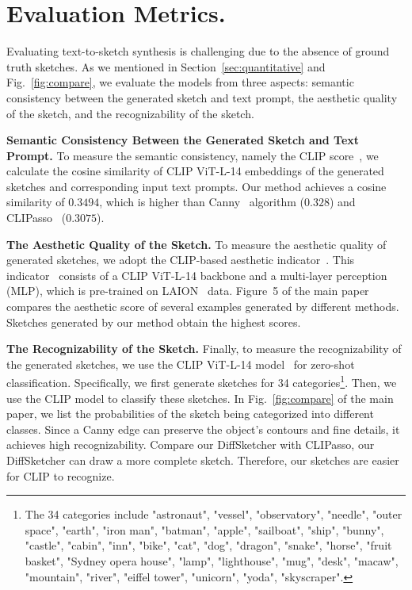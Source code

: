 \documentclass{article}
\begin{document}
\section{Evaluation Metrics.}
\label{supp:metric}
Evaluating text-to-sketch synthesis is challenging due to the absence of ground truth sketches. As we mentioned in Section~\ref{sec:quantitative} and Fig.~\ref{fig:compare}, we evaluate the models from three aspects: semantic consistency between the generated sketch and text prompt, the aesthetic quality of the sketch, and the recognizability of the sketch.

\textbf{Semantic Consistency Between the Generated Sketch and Text Prompt. } To measure the semantic consistency, namely the CLIP score~\cite{ldm_2022_Rombach,clipdraw_frans_2022}, we calculate the cosine similarity of CLIP ViT-L-14 embeddings of the generated sketches and corresponding input text prompts. 
Our method achieves a cosine similarity of $0.3494$, which is higher than  Canny~\cite{canny_1986} algorithm ($0.328$) and CLIPasso~\cite{vinker_2022_clipasso} ($0.3075$).

\textbf{The Aesthetic Quality of the Sketch. } To measure the aesthetic quality of generated sketches, we adopt the CLIP-based aesthetic indicator~\cite{aesthetic_predictor}. 
This indicator~\cite{aesthetic_predictor} consists of a CLIP ViT-L-14 backbone and a multi-layer perception (MLP), which is pre-trained on LAION~\cite{laion_schuhmann_2022} data.
Figure~5 of the main paper compares the aesthetic score of several examples generated by different methods. Sketches generated by our method obtain the highest scores.

\textbf{The Recognizability of the Sketch. } Finally, to measure the recognizability of the generated sketches, we use the CLIP ViT-L-14 model~\cite{clip_radford_2021} for zero-shot classification. Specifically, we first generate sketches for 34 categories\footnote{The 34 categories include "astronaut", "vessel", "observatory", "needle", "outer space", "earth", "iron man", "batman", "apple", "sailboat", "ship", "bunny", "castle", "cabin", "inn", "bike", "cat", "dog", "dragon", "snake", "horse", "fruit basket", "Sydney opera house", "lamp", "lighthouse", "mug", "desk", "macaw", "mountain", "river", "eiffel tower", "unicorn", "yoda", "skyscraper".}.
Then, we use the CLIP model to classify these sketches. In Fig.~\ref{fig:compare} of the main paper, we list the probabilities of the sketch being categorized into different classes. Since a Canny edge can preserve the object's contours and fine details, it achieves high recognizability. Compare our DiffSketcher with CLIPasso, our DiffSketcher can draw a more complete sketch. Therefore, our sketches are easier for CLIP to recognize.
\end{document}
